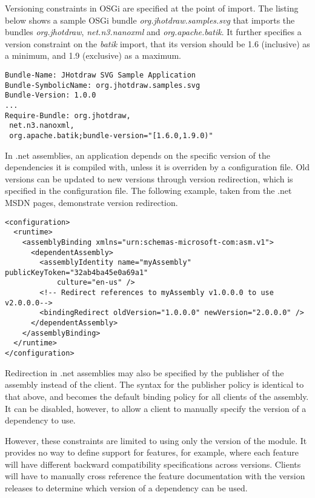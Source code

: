 Versioning constraints in OSGi are specified at the point of import. The
listing below shows a sample OSGi bundle \textit{org.jhotdraw.samples.svg}
that imports the bundles \textit{org.jhotdraw}, \textit{net.n3.nanoxml} and
\textit{org.apache.batik}. It further specifies a version constraint on
the \textit{batik} import, that its version should be 1.6 (inclusive) as
a minimum, and 1.9 (exclusive) as a maximum.

\begin{lstlisting}[caption=OSGi Bundle Version Constraints]
Bundle-Name: JHotdraw SVG Sample Application
Bundle-SymbolicName: org.jhotdraw.samples.svg
Bundle-Version: 1.0.0
...
Require-Bundle: org.jhotdraw,
 net.n3.nanoxml,
 org.apache.batik;bundle-version="[1.6.0,1.9.0)"
\end{lstlisting}

In .net assemblies, an application depends on the specific version of the 
dependencies it is compiled with, unless it is overriden by a configuration
file. Old versions can be updated to new versions through version redirection,
which is specified in the configuration file. The following example, taken
from the .net MSDN pages, demonstrate version redirection.

\begin{lstlisting}[caption=.net Assemblies Version Redirection]
<configuration>
  <runtime>
    <assemblyBinding xmlns="urn:schemas-microsoft-com:asm.v1">
      <dependentAssembly>
        <assemblyIdentity name="myAssembly" publicKeyToken="32ab4ba45e0a69a1" 
        	culture="en-us" />
        <!-- Redirect references to myAssembly v1.0.0.0 to use v2.0.0.0-->
        <bindingRedirect oldVersion="1.0.0.0" newVersion="2.0.0.0" />
      </dependentAssembly>
    </assemblyBinding>
  </runtime>
</configuration>
\end{lstlisting}

Redirection in .net assemblies may also be specified by the publisher of the
assembly instead of the client. The syntax for the publisher policy is identical
to that above, and becomes the default binding policy for all clients of the assembly.
It can be disabled, however, to allow a client to manually specify the version of
a dependency to use.

However, these constraints are limited to using only the version of the module.
It provides no way to define support for features, for example, where each feature 
will have different backward compatibility specifications across versions. 
Clients will have to manually cross reference the feature documentation with the version releases
to determine which version of a dependency can be used.

